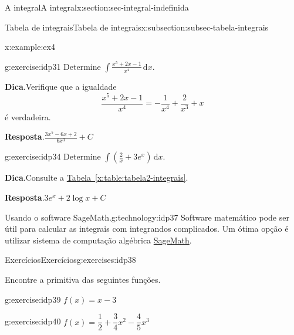 \documentclass[oneside,10pt,]{article}
\newcommand{\blocktitlefont}{\relax}
\newcommand{\xreffont}{\relax}
\numberwithin{equation}{section}
\newcommand{\dd}{\mathrm{d}}
\newcommand{\integral}[2]{\displaystyle\int {#1}\,\dd {#2}}
\begin{document}
\begin{sectionptx}{A integral}{}{A integral}{}{}{x:section:sec-integral-indefinida}
\begin{subsectionptx}{Tabela de integrais}{}{Tabela de integrais}{}{}{x:subsection:subsec-tabela-integrais}
\begin{example}{}{x:example:ex4}
%
\end{example}
\begin{inlineexercise}{}{g:exercise:idp31}%
Determine \(\integral{\frac{x^5+ 2x-1}{x^4}}{x}\).%
\par\smallskip%
\noindent\textbf{\blocktitlefont Dica}.\hypertarget{g:hint:idp32}{}\quad{}Verifique que a igualdade%
\begin{equation*}
\frac{x^5+ 2x-1}{x^4}=-\frac{1}{x^4}+ \frac{2}{x^3} + x
\end{equation*}
é verdadeira.%
\par\smallskip%
\noindent\textbf{\blocktitlefont Resposta}.\hypertarget{g:answer:idp33}{}\quad{}\(\frac{3x^5-6x+2}{6x^3} + C\)%
\end{inlineexercise}
\begin{inlineexercise}{}{g:exercise:idp34}%
Determine \(\integral{\left(\frac{2}{x}+3e^x\right)}{x}\).%
\par\smallskip%
\noindent\textbf{\blocktitlefont Dica}.\hypertarget{g:hint:idp35}{}\quad{}Consulte a \hyperref[x:table:tabela2-integrais]{Tabela~{\xreffont\ref{x:table:tabela2-integrais}}}.%
\par\smallskip%
\noindent\textbf{\blocktitlefont Resposta}.\hypertarget{g:answer:idp36}{}\quad{}\(3 e^{x} + 2 \log{x} + C\)%
\end{inlineexercise}
\end{subsectionptx}
\begin{technology}{Usando o software SageMath.}{g:technology:idp37}%
Software matemático pode ser útil para calcular as integrais com  integrandos complicados. Um ótima opção é utilizar sistema de computação algébrica  \href{https://www.sagemath.org}{SageMath}.%
%
\end{technology}
%
%
\typeout{************************************************}
\typeout{************************************************}
%
\begin{exercises-subsection}{Exercícios}{}{Exercícios}{}{}{g:exercises:idp38}
\par\medskip\noindent%
%
Encontre a primitiva das seguintes funções.%
\begin{exercisegroupcol}{2}
\begin{divisionexerciseegcol}{1}{}{}{g:exercise:idp39}%
\(f(x) = x - 3\)\end{divisionexerciseegcol}%
\begin{divisionexerciseegcol}{2}{}{}{g:exercise:idp40}%
\(f(x) = \dfrac{1}{2} + \dfrac{3}{4}x^2 - \dfrac{4}{5}x^3\)\end{divisionexerciseegcol}%

\end{exercisegroupcol}
\end{exercises-subsection}
\end{sectionptx}
\end{document}
